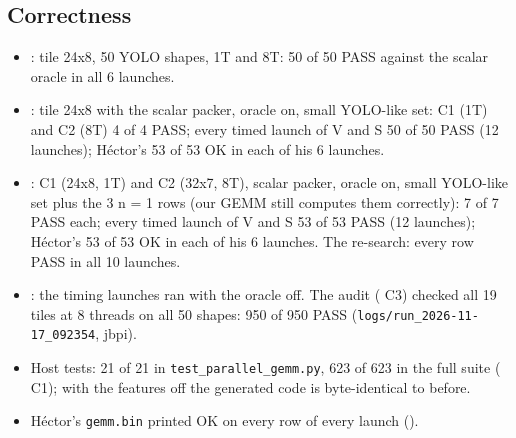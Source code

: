 \subsection{Correctness}
\begin{itemize}\setlength\itemsep{1pt}
\item {}: tile 24x8, 50 YOLO shapes, 1T and 8T: 50 of 50 PASS against the scalar oracle in all 6 launches.
\item {}: tile 24x8 with the scalar packer, oracle on, small YOLO-like set: C1 (1T) and C2 (8T) 4 of 4 PASS; every timed launch of V and S 50 of 50 PASS (12 launches); H\'ector's 53 of 53 OK in each of his 6 launches.
\item {}: C1 (24x8, 1T) and C2 (32x7, 8T), scalar packer, oracle on, small YOLO-like set plus the 3 n = 1 rows (our GEMM still computes them correctly): 7 of 7 PASS each; every timed launch of V and S 53 of 53 PASS (12 launches); H\'ector's 53 of 53 OK in each of his 6 launches. The re-search: every row PASS in all 10 launches.
\item {}: the timing launches ran with the oracle off. The audit ( C3) checked all 19 tiles at 8 threads on all 50 shapes: 950 of 950 PASS (\texttt{logs/run\_2026-11-17\_092354}, jbpi).
\item Host tests: 21 of 21 in \texttt{test\_parallel\_gemm.py}, 623 of 623 in the full suite ( C1); with the features off the generated code is byte-identical to before.
\item H\'ector's \texttt{gemm.bin} printed OK on every row of every launch ().
\end{itemize}
